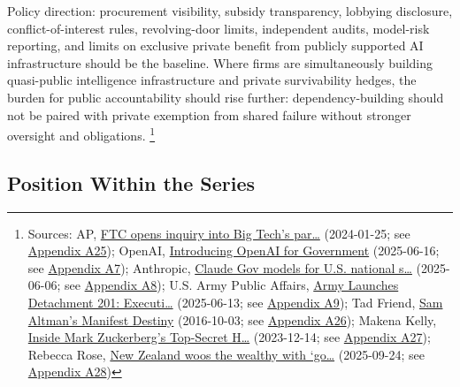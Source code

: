 \documentclass[
  american,
  11pt,
  letterpaper,
]{article}
\begin{document}
Policy direction: procurement visibility, subsidy transparency, lobbying
disclosure, conflict-of-interest rules, revolving-door limits,
independent audits, model-risk reporting, and limits on exclusive
private benefit from publicly supported AI infrastructure should be the
baseline. Where firms are simultaneously building quasi-public
intelligence infrastructure and private survivability hedges, the burden
for public accountability should rise further: dependency-building
should not be paired with private exemption from shared failure without
stronger oversight and obligations. \footnote{Sources: AP,
  \href{https://apnews.com/article/67feef411ef311f0be543f546ef34b3d}{FTC
  opens inquiry into Big Tech's par\ldots{}} (2024-01-25; see
  \hyperref[appendix-a25-ftc-opens-inquiry-into-big-tech-s-partnerships-with-leading-ai-startups]{Appendix
  A25}); OpenAI,
  \href{https://openai.com/global-affairs/introducing-openai-for-government/}{Introducing
  OpenAI for Government} (2025-06-16; see
  \hyperref[appendix-a7-introducing-openai-for-government]{Appendix
  A7}); Anthropic,
  \href{https://www.anthropic.com/news/claude-gov-models-for-u-s-national-security-customers}{Claude
  Gov models for U.S. national s\ldots{}} (2025-06-06; see
  \hyperref[appendix-a8-claude-gov-models-for-u-s-national-security-customers]{Appendix
  A8}); U.S. Army Public Affairs,
  \href{https://www.army.mil/article/286317/army_launches_detachment_201_executive_innovation_corps_to_drive_tech_transformation}{Army
  Launches Detachment 201: Executi\ldots{}} (2025-06-13; see
  \hyperref[appendix-a9-army-launches-detachment-201-executive-innovation-corps-to-drive-tech-transformation]{Appendix
  A9}); Tad Friend,
  \href{https://www.newyorker.com/magazine/2016/10/10/sam-altmans-manifest-destiny}{Sam
  Altman's Manifest Destiny} (2016-10-03; see
  \hyperref[appendix-a26-sam-altman-s-manifest-destiny]{Appendix A26});
  Makena Kelly,
  \href{https://www.wired.com/story/mark-zuckerberg-inside-hawaii-compound}{Inside
  Mark Zuckerberg's Top-Secret H\ldots{}} (2023-12-14; see
  \hyperref[appendix-a27-inside-mark-zuckerbergs-top-secret-hawaii-compound]{Appendix
  A27}); Rebecca Rose,
  \href{https://www.ft.com/content/76ca455c-3b16-4413-8738-3f17431d125b}{New
  Zealand woos the wealthy with `go\ldots{}} (2025-09-24; see
  \hyperref[appendix-a28-new-zealand-woos-the-wealthy-with-golden-visa-changes]{Appendix
  A28})}

\subsection{Position Within the
Series}\label{position-within-the-series}
\end{document}
